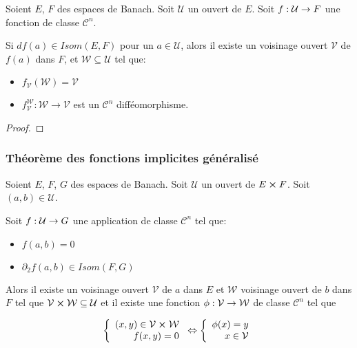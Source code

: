 \begin{theorem}
	Soient $E$, $F$ des espaces de Banach. Soit $\mathcal{U}$ un ouvert de $E$.
	Soit $f : \mathcal{U} \rightarrow F$ une fonction de classe
	$\mathcal{C}^{n}$.

	Si $df(a) \in Isom(E, F)$ pour un $a \in \mathcal{U}$, alors il existe un
	voisinage ouvert $\mathcal{V}$ de $f(a)$ dans $F$, et $\mathcal{W} \subseteq
	\mathcal{U}$ tel que:

	\begin{itemize}
		\item $f_{\mathcal{V}}(\mathcal{W}) = \mathcal{V}$
		\item $f_{\mathcal{V}}^{\mathcal{W}} : \mathcal{W} \rightarrow
			\mathcal{V}$ est un $\mathcal{C}^{n}$ difféomorphisme.
	\end{itemize}
\end{theorem}

\ifdefined\outputproof
\begin{proof}

\end{proof}
\fi

\subsubsection{Théorème des fonctions implicites généralisé}

\begin{theorem}
	Soient $E$, $F$, $G$ des espaces de Banach.
	Soit $\mathcal{U}$ un ouvert de $E \cross F$.
	Soit $(a, b) \in \mathcal{U}$.

	Soit $f : \mathcal{U} \rightarrow G$ une application de classe
	$\mathcal{C}^{n}$ tel que:

	\begin{itemize}
		\item $f(a, b) = 0$
		\item $\partial_{2}f (a, b) \in Isom(F, G)$
	\end{itemize}

	Alors il existe un voisinage ouvert $\mathcal{V}$ de $a$ dans $E$ et
	$\mathcal{W}$ voisinage ouvert de $b$ dans $F$ tel que $\mathcal{V}
	\cross \mathcal{W} \subseteq \mathcal{U}$ et il existe une fonction
	$\phi : \mathcal{V} \rightarrow \mathcal{W}$ de classe $\mathcal{C}^{n}$
	tel que

	\begin{align*}
	\left\{
		\begin{array}{r c l}
			(x, y) \in \mathcal{V} \cross \mathcal{W} \\
			f(x, y) = 0
		\end{array}
	\right.
	\Leftrightarrow
	\left\{
		\begin{array}{r c l}
			\phi(x) = y \\
			x \in \mathcal{V}
		\end{array}
	\right.
	\end{align*}
\end{theorem}

